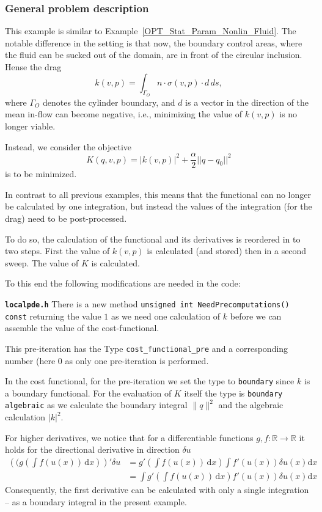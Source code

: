 \subsubsection{General problem description}
This example is similar to Example~\ref{OPT_Stat_Param_Nonlin_Fluid}.
The notable difference in the setting is that now, the boundary control areas, 
where the fluid can be sucked out of the domain, are in front of the 
circular inclusion. Hense the drag
\[
k(v,p) = \int_{\Gamma_O} n\cdot \sigma(v,p)\cdot d \, ds,
\]
where $\Gamma_O$ denotes the cylinder boundary, and $d$ is a vector in the
direction of the mean in-flow can become negative, i.e., minimizing the 
value of $k(v,p)$ is no longer viable. 

Instead, we consider the objective 
\[
K(q,v,p) = |k(v,p)|^2 + \frac{\alpha}{2}||q - q_0||^2
\] 
is to be minimized.

In contrast to all previous examples, this means that the functional can
no longer be calculated by one integration, but instead the values of the 
integration (for the drag) need to be post-processed.

To do so, the calculation of the functional and its derivatives
is reordered in to two steps. First the value of $k(v,p)$ is
calculated (and stored) then in a second sweep. The value of
$K$ is calculated.

To this end the following modifications are needed in the
code:


\textbf{\texttt{localpde.h}}
There is a new method \texttt{unsigned int NeedPrecomputations() const}
returning the value $1$ as we need one calculation of $k$ before we can
assemble the value of the cost-functional.

This pre-iteration has the Type \texttt{cost\_functional\_pre} and a corresponding
number (here $0$ as only one pre-iteration is performed.

In the cost functional, for the pre-iteration we set the type to
\texttt{boundary} since $k$ is a boundary functional.
For the evaluation of $K$ itself the type is \texttt{boundary algebraic}
as we calculate the boundary integral $\|q\|^2$ and the algebraic calculation
$|{k}|^2$.

For higher derivatives, we notice that for a differentiable functions $g,f\colon \mathbb R\rightarrow \mathbb R$
it holds for the directional derivative in direction $\delta u$
\begin{align*}
 \left((g\left(\int f(u(x))\,\mathrm{d}x\right)\right)'\delta u
  &= g'(\int f(u(x))\,\mathrm{d}x) \int f'(u(x)) \delta u(x) \mathrm{d}x \\
  &= \int g'(\int f(u(x))\,\mathrm{d}x) f'(u(x)) \delta u(x) \mathrm{d}x 
\end{align*}
Consequently, the first derivative can be calculated with only a single integration
-- as a boundary integral in the present example.
